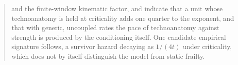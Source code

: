 \begin{abstract}
and the finite-window kinematic factor, and indicate that a unit whose technoanatomy is held at criticality adds one quarter to the exponent, and that with generic, uncoupled rates the pace of technoanatomy against strength is produced by the conditioning itself. One candidate empirical signature follows, a survivor hazard decaying as $1/(4t)$ under criticality, which does not by itself distinguish the model from static frailty.
\end{abstract}
